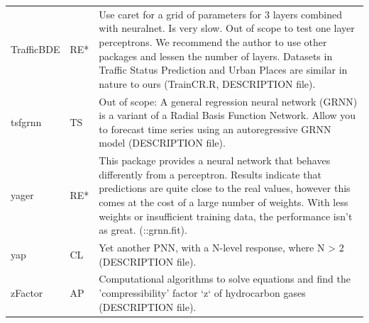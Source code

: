 \begin{Schunk}
\begin{longtable}[t]{ll>{\raggedright\arraybackslash}p{10cm}}
TrafficBDE & RE* & Use caret for a grid of parameters for 3 layers combined with neuralnet. Is very slow. Out of scope to test one layer perceptrons. We recommend the author to use other packages and lessen the number of layers. Datasets in Traffic Status Prediction and Urban Places are similar in nature to ours (TrainCR.R, DESCRIPTION file).\\
tsfgrnn & TS & Out of scope: A general regression neural network (GRNN) is a variant of a Radial Basis Function Network. Allow you to forecast time series using an autoregressive GRNN model (DESCRIPTION file).\\
\addlinespace
yager & RE* & This package provides a neural network that behaves differently from a perceptron. Results indicate that predictions are quite close to the real values, however this comes at the cost of a large number of weights. With less weights or insufficient training data, the performance isn't as great. (::grnn.fit).\\
yap & CL & Yet another PNN, with a N-level response, where N > 2 (DESCRIPTION file).\\
zFactor & AP & Computational algorithms to solve equations and find the 'compressibility' factor `z` of hydrocarbon gases (DESCRIPTION file).\\*
\end{longtable}
\endgroup{}

\end{Schunk}


\address{%
Salsabila Mahdi\\
Universitas Syiah Kuala\\%
JL. Syech Abdurrauf No.3, Aceh 23111, Indonesia\\
%
%
\textit{ORCiD: \href{https://orcid.org/0000-0002-2559-4154}{0000-0002-2559-4154}}\\%
\href{mailto:bila.mahdi@mhs.unsyiah.ac.id}{\nolinkurl{bila.mahdi@mhs.unsyiah.ac.id}}%
}

\address{%
Akshaj Verma\\
Manipal Institute of Technology\\%
Manipal, Karnataka, 576104, India\\
%
%
\textit{ORCiD: \href{https://orcid.org/0000-0002-3936-0033}{0000-0002-3936-0033}}\\%
\href{mailto:akshajverma7@gmail.com}{\nolinkurl{akshajverma7@gmail.com}}%
}

\address{%
Christophe Dutang\\
Université Paris-Dauphine, University PSL, CNRS, CEREMADE\\%
Place du Maréchal de Lattre de Tassigny, 75016 Paris, France\\
%
%
\textit{ORCiD: \href{https://orcid.org/0000-0001-6732-1501}{0000-0001-6732-1501}}\\%
\href{mailto:dutang@ceremade.dauphine.fr}{\nolinkurl{dutang@ceremade.dauphine.fr}}%
}

